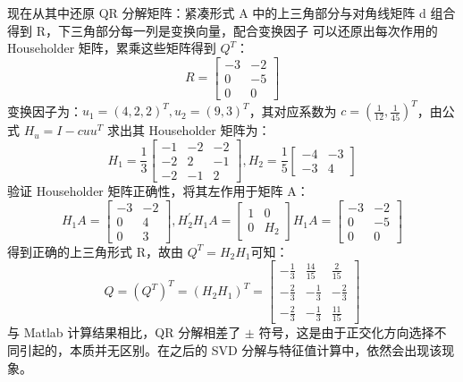 现在从其中还原 QR 分解矩阵：紧凑形式 A 中的上三角部分与对角线矩阵 d 组合得到 R，下三角部分每一列是变换向量，配合变换因子
可以还原出每次作用的 Householder 矩阵，累乘这些矩阵得到 $Q^T$：
\begin{equation*}
    R=\begin{bmatrix}
        -3 & -2 \\
        0  & -5 \\
        0  & 0
    \end{bmatrix}
\end{equation*}
变换因子为：$u_1=(4,2,2)^T,u_2=(9,3)^T$，其对应系数为 $c=(\frac{1}{12},\frac{1}{45})^T$，由公式 $H_u=I-cuu^T$ 求出其 Householder 矩阵为：
\begin{equation*}
    H_1=\frac{1}{3} \begin{bmatrix}
        -1 & -2 & -2 \\
        -2 & 2  & -1 \\
        -2 & -1 & 2
    \end{bmatrix},
    H_2=\frac{1}{5} \begin{bmatrix}
        -4 & -3 \\
        -3 & 4
    \end{bmatrix}
\end{equation*}
验证 Householder 矩阵正确性，将其左作用于矩阵 A：
\begin{equation*}
    H_1A=\begin{bmatrix}
        -3 & -2 \\
        0  & 4  \\
        0  & 3
    \end{bmatrix},H_2^{'}H_1A=\begin{bmatrix}
        1 & 0   \\
        0 & H_2
    \end{bmatrix}H_1A=\begin{bmatrix}
        -3 & -2 \\
        0  & -5 \\
        0  & 0
    \end{bmatrix}
\end{equation*}
得到正确的上三角形式 R，故由 $Q^T=H_2H_1$可知：
\begin{equation*}
    Q=(Q^T)^T=(H_2H_1)^T=\begin{bmatrix}
        -\frac{1}{3} & \frac{14}{15} & \frac{2}{15}  \\
        -\frac{2}{3} & -\frac{1}{3}  & -\frac{2}{3}  \\
        -\frac{2}{3} & -\frac{1}{3}  & \frac{11}{15}
    \end{bmatrix}
\end{equation*}
与 Matlab 计算结果相比，QR 分解相差了 $\pm$ 符号，这是由于正交化方向选择不同引起的，本质并无区别。在之后的 SVD 分解与特征值计算中，依然会出现该现象。
